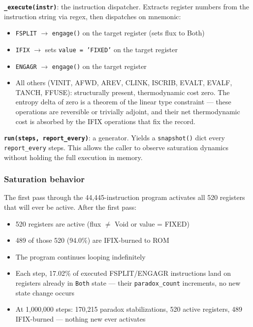 \documentclass[12pt,a4paper]{article}
\begin{document}
\textbf{\texttt{\_execute(instr)}}: the instruction dispatcher. Extracts register numbers from the instruction string via regex, then dispatches on mnemonic:

\begin{itemize}
    \item \texttt{FSPLIT} $\rightarrow$ \texttt{engage()} on the target register (sets flux to Both)
    \item \texttt{IFIX} $\rightarrow$ sets \texttt{value = 'FIXED'} on the target register
    \item \texttt{ENGAGR} $\rightarrow$ \texttt{engage()} on the target register
    \item All others (VINIT, AFWD, AREV, CLINK, ISCRIB, EVALT, EVALF, TANCH, FFUSE): structurally present, thermodynamic cost zero. The entropy delta of zero is a theorem of the linear type constraint --- these operations are reversible or trivially adjoint, and their net thermodynamic cost is absorbed by the IFIX operations that fix the record.
\end{itemize}

\textbf{\texttt{run(steps, report\_every)}}: a generator. Yields a \texttt{snapshot()} dict every \texttt{report\_every} steps. This allows the caller to observe saturation dynamics without holding the full execution in memory.

\subsubsection{Saturation behavior}

The first pass through the 44,445-instruction program activates all 520 registers that will ever be active. After the first pass:

\begin{itemize}
    \item 520 registers are active (flux $\neq$ Void or value = FIXED)
    \item 489 of those 520 (94.0\%) are IFIX-burned to ROM
    \item The program continues looping indefinitely
    \item Each step, 17.02\% of executed FSPLIT/ENGAGR instructions land on registers already in \texttt{Both} state --- their \texttt{paradox\_count} increments, no new state change occurs
    \item At 1,000,000 steps: 170,215 paradox stabilizations, 520 active registers, 489 IFIX-burned --- nothing new ever activates
\end{itemize}
\end{document}
